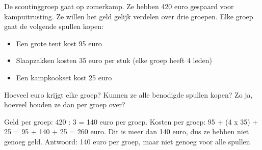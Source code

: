 \begin{opgave}
De scoutinggroep gaat op zomerkamp. Ze hebben 420 euro gespaard voor kampuitrusting. Ze
willen het geld gelijk verdelen over drie groepen. Elke groep gaat de volgende spullen kopen:

\begin{itemize}
\item Een grote tent kost 95 euro
\item Slaapzakken kosten 35 euro per stuk (elke groep heeft 4 leden)
\item Een kampkookset kost 25 euro
\end{itemize}

Hoeveel euro krijgt elke groep? Kunnen ze alle benodigde spullen kopen? Zo ja, hoeveel
houden ze dan per groep over?
\end{opgave}

\begin{oplossing}
Geld per groep: 420 : 3 = 140 euro per groep.
Kosten per groep: 95 + (4 x 35) + 25 = 95 + 140 + 25 = 260 euro.
Dit is meer dan 140 euro, dus ze hebben niet genoeg geld.
Antwoord: 140 euro per groep, maar niet genoeg voor alle spullen
\end{oplossing}
